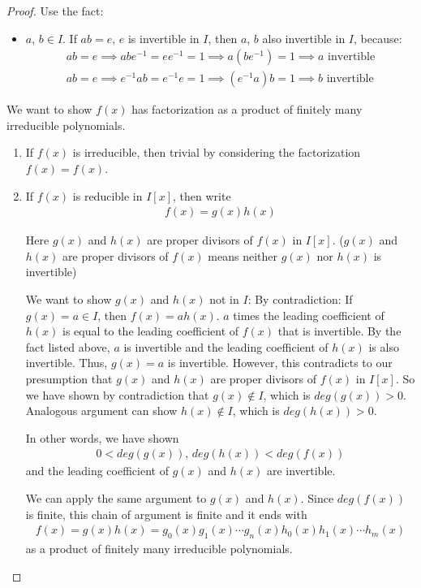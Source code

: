 \documentclass[utf8]{ctexbook}
\theoremstyle{definition}
\begin{document}
\begin{proof}
Use the fact:
\begin{itemize}
\item{$a$, $b \in I$. If $ab = e$, $e$ is invertible in $I$, then $a$, $b$ also invertible in $I$, because:
\begin{align*}
ab = e \implies ab e^{-1} = e e^{-1} = 1 \implies a(be^{-1}) = 1 \implies a \mbox{ invertible} \\
ab = e \implies e^{-1} ab = e^{-1} e = 1 \implies (e^{-1} a) b = 1 \implies b \mbox{ invertible}
\end{align*}
}
\end{itemize}

We want to show $f(x)$ has factorization as a product of finitely many irreducible polynomials.
\begin{enumerate}
\item{If $f(x)$ is irreducible, then trivial by considering the factorization $f(x) = f(x)$.}
\item{If $f(x)$ is reducible in $I[x]$, then write
\begin{align*}
f(x) = g(x) h(x)
\end{align*}

Here $g(x)$ and $h(x)$ are proper divisors of $f(x)$ in $I[x]$. ($g(x)$ and $h(x)$ are proper divisors of $f(x)$ means neither $g(x)$ nor $h(x)$ is invertible)

We want to show $g(x)$ and $h(x)$ not in $I$: By contradiction: If $g(x) = a \in I$, then $f(x) = a h(x)$. $a$ times the leading coefficient of $h(x)$ is equal to the leading coefficient of $f(x)$ that is invertible. By the fact listed above, $a$ is invertible and the leading coefficient of $h(x)$ is also invertible. Thus, $g(x) =a$ is invertible. However, this contradicts to our presumption that $g(x)$ and $h(x)$ are proper divisors of $f(x)$ in $I[x]$. So we have shown by contradiction that $g(x) \not \in I$, which is $deg(g(x)) > 0$. Analogous argument can show $h(x) \not \in I$, which is $deg(h(x)) > 0$.

In other words, we have shown
\begin{align*}
0 < deg(g(x)), \, deg(h(x)) < deg(f(x))
\end{align*}
and the leading coefficient of $g(x)$ and $h(x)$ are invertible.

We can apply the same argument to $g(x)$ and $h(x)$. Since $deg(f(x))$ is finite, this chain of argument is finite and it ends with
\begin{align*}
f(x) = g(x) h(x) = g_0 (x) g_1 (x) \cdots g_n (x) h_0 (x) h_1 (x) \cdots h_m (x)
\end{align*}
as a product of finitely many irreducible polynomials.
}
\end{enumerate}

\end{proof}
\end{document}
